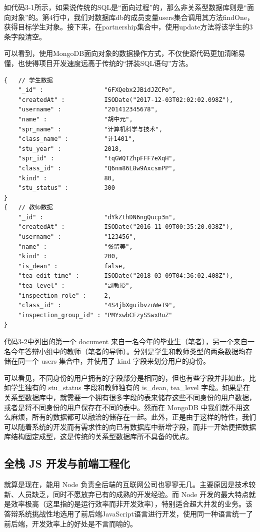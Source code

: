 如代码3-1所示，如果说传统的SQL是“面向过程”的，那么非关系型数据库则是“面向对象”的。第4行中，我们对数据库db的成员变量users集合调用其方法findOne，获得目标学生对象。接下来，在partnership集合中，使用update方法将该学生的3条字段清空。

可以看到，使用MongoDB面向对象的数据操作方式，不仅使源代码更加清晰易懂，也使得项目开发速度远高于传统的“拼装SQL语句”方法。

\begin{lstlisting}[title=代码 3-2：MongoDB 中学生和教师的数据示例]
{   // 学生数据
	"_id" : 	 			"6FXQebx2JBidJZCPo",
	"createdAt" : 			ISODate("2017-12-03T02:02:02.098Z"),
	"username" : 			"201412345678",
	"name" : 				"胡中元",
	"spr_name" : 			"计算机科学与技术",
	"class_name" : 			"计1401",
	"stu_year" : 			2018,
	"spr_id" : 				"tqGWQTZhpFFF7eXqH",
	"class_id" : 			"Q6nm86L8w9AxcsmPP",
	"kind" : 				80,
	"stu_status" :  		300
}
{   // 教师数据
	"_id" : 				"dYkZthDN6ngQucp3n",
	"createdAt" : 			ISODate("2016-11-09T00:35:20.038Z"),
	"username" : 			"123456",
	"name" : 				"张留美",
	"kind" : 				200,
	"is_dean" : 			false,
	"tea_edit_time" : 		ISODate("2018-03-09T04:36:02.408Z"),
	"tea_level" : 			"副教授",
	"inspection_role" : 	2,
	"class_id" : 			"4S4jbXguibvzuWeT9",
	"inspection_group_id" : "PMYxwbCFzySSwxRuZ"
}
\end{lstlisting}

代码3-2中列出的第一个 document 来自一名今年的毕业生（笔者），另一个来自一名今年答辩小组中的教师（笔者的导师）。分别是学生和教师类型的两条数据均存储在同一个 users 集合中，并使用了 kind 字段来划分用户的身份。

可以看见，不同身份的用户拥有的字段部分是相同的，但也有些字段并非如此，比如学生独有的 stu\_status 字段和教师独有的 is\_dean, tea\_level 字段。如果是在关系型数据库中，就需要一个拥有很多字段的表来储存这些不同身份的用户数据，或者是将不同身份的用户保存在不同的表中。然而在 MongoDB 中我们就不用这么麻烦，所有的数据都可以融洽的储存在一起。此外，正是由于这样的特性，我们可以随着系统的开发而有需求性的向已有数据库中新增字段，而非一开始便把数据库结构固定成型，这是传统的关系型数据库所不具备的优点。


\subsection{全栈 JS 开发与前端工程化}

就算是现在，能用 Node 负责全后端的互联网公司也寥寥无几。主要原因是技术较新、人员缺乏，同时不愿放弃已有的成熟的开发经验。而 Node 开发的最大特点就是效率极高（这里指的是运行效率而非开发效率），特别适合超大并发的业务。该答辩系统挑战性地选用了前后端JavaScript语言进行开发，使用同一种语言统一了前后端，开发效率上的好处是不言而喻的。

